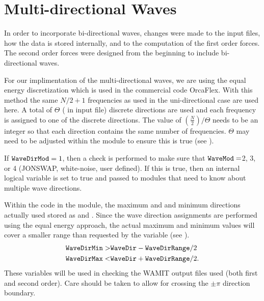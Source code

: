 \chapter{Multi-directional Waves}
\label{chap:MultiDir}


In order to incorporate bi-directional waves, changes were made to the input files, how the data is stored internally, and to the computation of the first order forces. The second order forces were designed from the beginning to include bi-directional waves.

For our implimentation of the multi-directional waves, we are using the equal energy discretization which is used in the commercial code OrcaFlex.  With this method the same $N/2+1$ frequencies as used in the uni-directional case are used here.  A total of $\Theta$ ( in input file) discrete directions are used and each frequency is assigned to one of the discrete directions.
The value of $(\frac{N}{2}) / \Theta$ needs to be an integer so that each direction contains the same number of frequencies. $\Theta$ may need to be adjusted within the  module to ensure this is true (see ).

\begin{center}
   \begin{minipage}[t]{\linewidth}
   \end{minipage}
   \label{tab:HD_WAMIT2_InputModsWaveDir}
\end{center}


If $\texttt{WaveDirMod}=1$, then a check is performed to make sure that $\texttt{WaveMod}=$2, 3, or 4 (JONSWAP, white-noise, user defined).  If this is true, then an internal logical variable  is set to true and passed to modules that need to know about multiple wave directions.

Within the code in the  module, the maximum and and minimum directions actually used stored as  and .  Since the wave direction assignments are performed using the equal energy approach, the actual maximum and minimum values will cover a smaller range than requested by the  variable (see ).
\begin{eqnarray}
   \texttt{WaveDirMin} >& \texttt{WaveDir} - \texttt{WaveDirRange}/2\\
   \texttt{WaveDirMax} <& \texttt{WaveDir} + \texttt{WaveDirRange}/2.
\label{eq:WaveDirMinMax}
\end{eqnarray}
These variables will be used in checking the WAMIT output files used (both first and second order).  Care should be taken to allow for crossing the $\pm \pi$ direction boundary.


